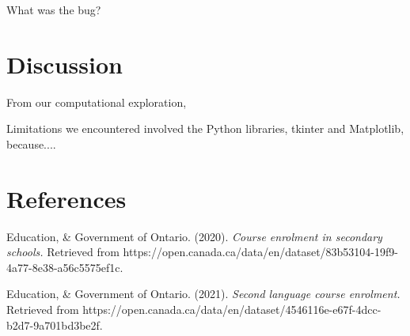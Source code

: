 \documentclass[fontsize=11pt]{article}
\begin{document}
What was the bug? 


\section*{Discussion}

From our computational exploration, 

Limitations we encountered involved the Python libraries, tkinter and Matplotlib, because.... 

\section*{References}

\noindent Education, \& Government of Ontario. (2020). \emph{Course enrolment in secondary schools.} Retrieved from \linebreak \indent https://open.canada.ca/data/en/dataset/83b53104-19f9-4a77-8e38-a56c5575ef1c.

\noindent Education, \& Government of Ontario. (2021). \emph{Second language course enrolment.} Retrieved from \linebreak \indent https://open.canada.ca/data/en/dataset/4546116e-e67f-4dcc-b2d7-9a701bd3be2f. 

\end{document}

